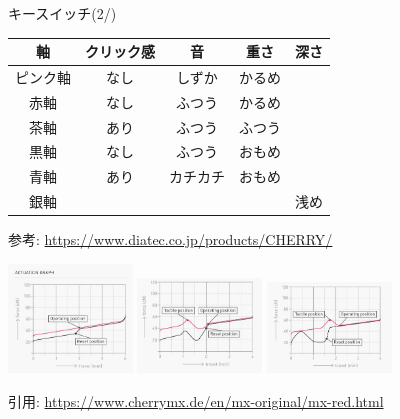 \documentclass[cjk,dvipdfmx,10pt,compress,fragile%
hyperref={bookmarks=true,bookmarksnumbered=true,bookmarksopen=false,%
colorlinks=false,%
pdftitle={第 134 回 関西 Debian 勉強会},%
pdfauthor={小林},%
pdfsubject={資料},%
}]{beamer}
\begin{document}
\begin{frame}[fragile,t]{キースイッチ(2/)}
 \vspace*{-1zw}
 \begin{center}
  \footnotesize
  \begin{tabular}[tb]{c|cccc}
   軸       & クリック感 & 音       & 重さ   & 深さ \\ \hline
   ピンク軸 & なし       & しずか   & かるめ\\
   赤軸     & なし       & ふつう   & かるめ\\
   茶軸     & あり       & ふつう   & ふつう\\
   黒軸     & なし       & ふつう   & おもめ \\
   青軸     & あり       & カチカチ & おもめ \\
   銀軸     &            &          &        & 浅め
  \end{tabular}
 \end{center}
 \begin{flushright}
  {\footnotesize 参考: \url{https://www.diatec.co.jp/products/CHERRY/}}
 \end{flushright}
 \begin{center}
  \includegraphics[keepaspectratio,width=3.3cm]{./img/actuation-red.jpg}
  \includegraphics[keepaspectratio,width=3.3cm]{./img/actuation-brown.jpg}
  \includegraphics[keepaspectratio,width=3.3cm]{./img/actuation-blue.jpg}
 \end{center}
 \begin{flushright}
  {\footnotesize 引用: \url{https://www.cherrymx.de/en/mx-original/mx-red.html}}
\end{flushright}
\end{frame}
\end{document}
